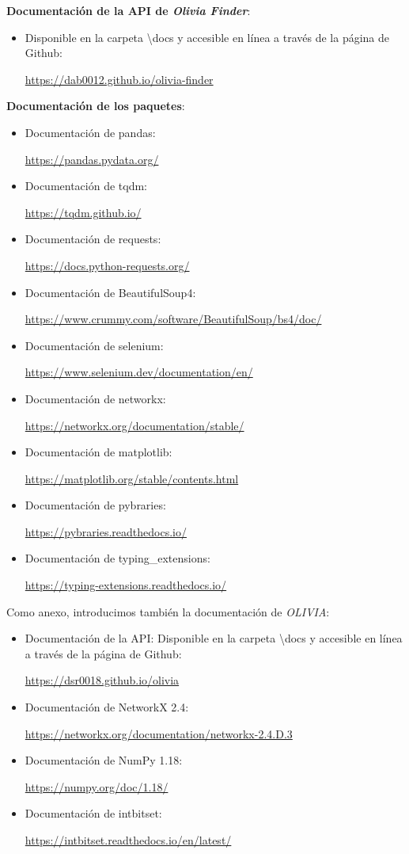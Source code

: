 \textbf{Documentación de la API de \textit{Olivia Finder}}:
\begin{itemize}
\item Disponible en la carpeta \textbackslash docs y accesible en línea a través de la página de Github: 

\url{https://dab0012.github.io/olivia-finder}
\end{itemize}

\textbf{Documentación de los paquetes}:
\begin{itemize}
\item Documentación de pandas:

\url{https://pandas.pydata.org/}
\item Documentación de tqdm:
 
\url{https://tqdm.github.io/}
\item Documentación de requests:
 
\url{https://docs.python-requests.org/}
\item Documentación de BeautifulSoup4:
 
\url{https://www.crummy.com/software/BeautifulSoup/bs4/doc/}
\item Documentación de selenium: 
 
\url{https://www.selenium.dev/documentation/en/}
\item Documentación de networkx: 
 
\url{https://networkx.org/documentation/stable/}
\item Documentación de matplotlib: 
 
\url{https://matplotlib.org/stable/contents.html}
\item Documentación de pybraries: 
 
\url{https://pybraries.readthedocs.io/}
\item Documentación de typing\_extensions: 
 
\url{https://typing-extensions.readthedocs.io/}
\end{itemize}

Como anexo, introducimos también la documentación de \textit{OLIVIA}:

\begin{itemize}
\item Documentación de la API: Disponible en la carpeta \textbackslash docs y accesible en línea a través de la página de Github: 

\url{https://dsr0018.github.io/olivia}
\item Documentación de NetworkX 2.4: 

\url{https://networkx.org/documentation/networkx-2.4.D.3}
\item Documentación de NumPy 1.18: 

\url{https://numpy.org/doc/1.18/}
\item Documentación de intbitset: 

\url{https://intbitset.readthedocs.io/en/latest/}
\end{itemize}

